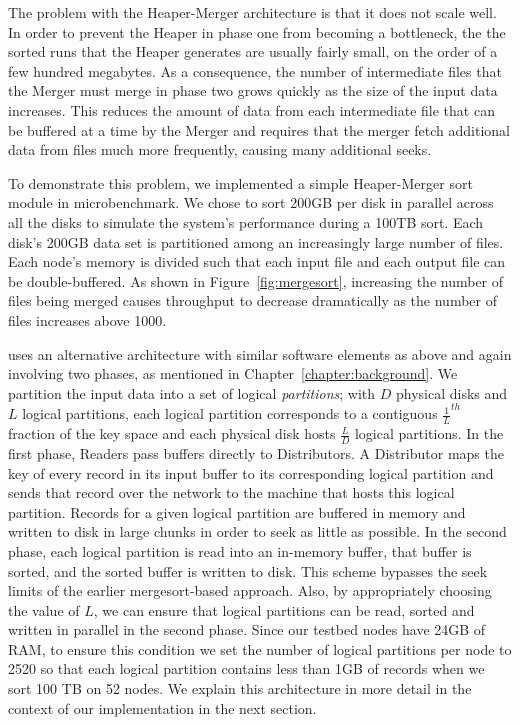 The problem with the Heaper-Merger architecture is that it does not scale well.
In order to prevent the Heaper in phase one from becoming a bottleneck, the the
sorted runs that the Heaper generates are usually fairly small, on the order of
a few hundred megabytes. As a consequence, the number of intermediate files
that the Merger must merge in phase two grows quickly as the size of the input
data increases. This reduces the amount of data from each intermediate file
that can be buffered at a time by the Merger and requires that the merger fetch
additional data from files much more frequently, causing many additional seeks.

To demonstrate this problem, we implemented a simple Heaper-Merger sort module
in microbenchmark. We chose to sort 200GB per disk in parallel across all the
disks to simulate the system's performance during a 100TB sort. Each disk's
200GB data set is partitioned among an increasingly large number of files. Each
node's memory is divided such that each input file and each output file can be
double-buffered. As shown in Figure~\ref{fig:mergesort}, increasing the number
of files being merged causes throughput to decrease dramatically as the number
of files increases above 1000.

\tritonsort uses an alternative architecture with similar software elements as
above and again involving two phases, as mentioned in
Chapter~\ref{chapter:background}.  We partition the input data into a set of
logical \emph{partitions}; with $D$ physical disks and $L$ logical partitions,
each logical partition corresponds to a contiguous $\frac{1}{L}^{th}$ fraction
of the key space and each physical disk hosts $\frac{L}{D}$ logical partitions.
In the first phase, Readers pass buffers directly to Distributors.  A
Distributor maps the key of every record in its input buffer to its
corresponding logical partition and sends that record over the network to the
machine that hosts this logical partition.  Records for a given logical
partition are buffered in memory and written to disk in large chunks in order
to seek as little as possible.  In the second phase, each logical partition is
read into an in-memory buffer, that buffer is sorted, and the sorted buffer is
written to disk.  This scheme bypasses the seek limits of the earlier
mergesort-based approach.  Also, by appropriately choosing the value of $L$, we
can ensure that logical partitions can be read, sorted and written in parallel
in the second phase.  Since our testbed nodes have 24GB of RAM, to ensure this
condition we set the number of logical partitions per node to 2520 so that each
logical partition contains less than 1GB of records when we sort 100 TB on 52
nodes.  We explain this architecture in more detail in the context of our
implementation in the next section.

